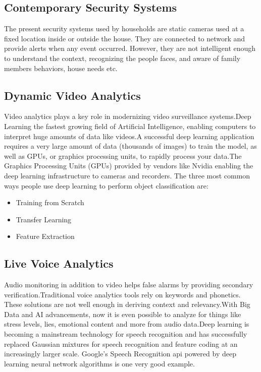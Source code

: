 \documentclass[sigconf]{acmart}
\begin{document}
\subsection{Contemporary Security Systems}

The present security systems used by households are static cameras used at a fixed location inside or outside the house. They are connected to network and provide alerts when any event occurred. However, they are not intelligent enough to understand the context, recognizing the people faces, and aware of family members behaviors, house needs etc.

\subsection{Dynamic Video Analytics}

Video analytics plays a key role in modernizing video surveillance systems.Deep Learning the fastest growing field of Artificial Intelligence, enabling computers to interpret huge 
amounts of data like videos.A successful deep learning application requires a very large amount of data (thousands of images) to train the model, as well as GPUs, or graphics processing units, to rapidly process your data.The Graphics Processing Units (GPUs) provided by vendors like Nvidia enabling the deep learning infrastructure to cameras and recorders. The three most common ways people use deep learning to perform object classification are:

\begin{itemize}
 \item Training from Scratch
 \item Transfer Learning
 \item Feature Extraction
\end{itemize}

\subsection{Live Voice Analytics}
Audio monitoring in addition to video helps false alarms by providing secondary verification.Traditional voice analytics tools rely on keywords and phonetics. These solutions are not well enough in deriving context and relevancy.With Big Data and AI advancements, now it is even possible to analyze for things like stress levels, lies, emotional content and more from audio data.Deep learning is becoming a mainstream technology for speech recognition and has successfully replaced  Gaussian  mixtures  for  speech  recognition  and  feature  coding  at  an  increasingly  larger scale. Google's Speech Recognition api  powered by deep learning neural network algorithms is one very good example.
\end{document}
